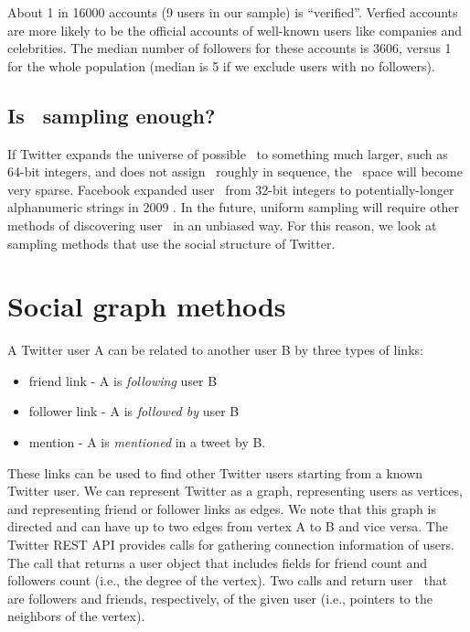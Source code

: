  About 1 in 16000 accounts (9 users in our sample) is ``verified''. Verfied
 accounts are more likely to be the official accounts of well-known
 users like companies and celebrities. The median number of followers
 for these accounts is 3606, versus 1 for the whole population
 (median is 5 if we exclude users with no followers).

 \subsection{Is \id~sampling enough?}

 If Twitter expands the universe of possible \ids~to something much
 larger, such as 64-bit integers, and does not assign \ids~roughly in
 sequence, the \id~space will become very sparse. Facebook expanded
 user \ids~from 32-bit integers
 to potentially-longer alphanumeric strings in 2009 \cite{Minas:2009}.
 In the future, uniform sampling will require other methods of
 discovering user \ids~in an unbiased way. For this reason, we look at
 sampling methods that use the social structure of Twitter.



 \section{Social graph methods}
 \label{sec:graphmethods}

A Twitter user A can be related to another user B by three types of
links:
\begin{itemize}
    \item friend link - A is \emph{following} user B
    \item follower link - A is \emph{followed by} user B
    \item mention - A is \emph{mentioned} in a tweet by B.
\end{itemize}

These links can be used to find other Twitter users starting from a known
Twitter user. We can represent Twitter as a graph, representing users
as vertices, and representing friend or follower links as edges. We
note that this graph is directed and can have up to two edges from
vertex A to B and vice versa. The
Twitter REST API provides calls for gathering connection information
of users. The  call that returns a user object that includes
fields for friend count and followers count (i.e., the degree of
the vertex). Two calls 
and  return user \ids~that are followers and friends,
respectively, of the given user (i.e., pointers to the neighbors of
the vertex).


